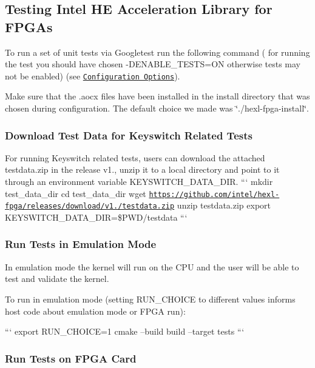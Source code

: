 \subsection*{Testing Intel H\-E Acceleration Library for F\-P\-G\-As}

To run a set of unit tests via Googletest run the following command ( for running the test you should have chosen {\ttfamily -\/\-D\-E\-N\-A\-B\-L\-E\-\_\-\-T\-E\-S\-T\-S=O\-N} otherwise tests may not be enabled) (see \href{#configuration-options}{\tt Configuration Options}). \par
 Make sure that the .aocx files have been installed in the install directory that was chosen during configuration. The default choice we made was \char`\"{}./hexl-\/fpga-\/install\char`\"{}. \par


\subsubsection*{Download Test Data for Keyswitch Related Tests}

For running Keyswitch related tests, users can download the attached testdata.\-zip in the release v1., unzip it to a local directory and point to it through an environment variable K\-E\-Y\-S\-W\-I\-T\-C\-H\-\_\-\-D\-A\-T\-A\-\_\-\-D\-I\-R. ``` mkdir test\-\_\-data\-\_\-dir cd test\-\_\-data\-\_\-dir wget \href{https://github.com/intel/hexl-fpga/releases/download/v1.2/testdata.zip}{\tt https\-://github.\-com/intel/hexl-\/fpga/releases/download/v1./testdata.\-zip} unzip testdata.\-zip export K\-E\-Y\-S\-W\-I\-T\-C\-H\-\_\-\-D\-A\-T\-A\-\_\-\-D\-I\-R=\$\-P\-W\-D/testdata ```

\subsubsection*{Run Tests in Emulation Mode}

In emulation mode the kernel will run on the C\-P\-U and the user will be able to test and validate the kernel. \par
 To run in emulation mode (setting R\-U\-N\-\_\-\-C\-H\-O\-I\-C\-E to different values informs host code about emulation mode or F\-P\-G\-A run)\-: \par


``` export R\-U\-N\-\_\-\-C\-H\-O\-I\-C\-E=1 cmake --build build --target tests ```

\subsubsection*{Run Tests on F\-P\-G\-A Card}

